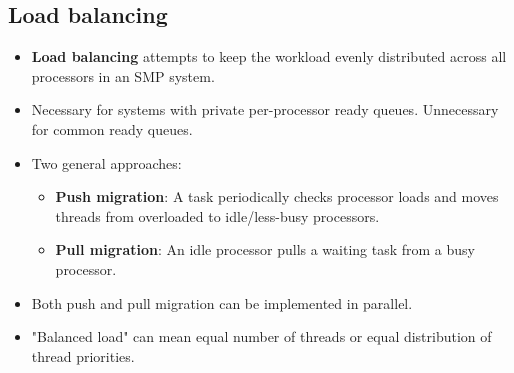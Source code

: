 \subsection{Load balancing}
\begin{itemize}
    \item \textbf{Load balancing} attempts to keep the workload evenly distributed across all processors in an SMP system.
    \item Necessary for systems with private per-processor ready queues. Unnecessary for common ready queues.
    \item Two general approaches:
        \begin{itemize}
            \item \textbf{Push migration}: A task periodically checks processor loads and moves threads from overloaded to idle/less-busy processors.
            \item \textbf{Pull migration}: An idle processor pulls a waiting task from a busy processor.
        \end{itemize}
    \item Both push and pull migration can be implemented in parallel.
    \item "Balanced load" can mean equal number of threads or equal distribution of thread priorities.
\end{itemize}

